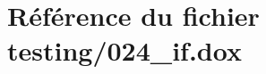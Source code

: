 \hypertarget{024__if_8dox}{}\section{Référence du fichier testing/024\+\_\+if.dox}
\label{024__if_8dox}

